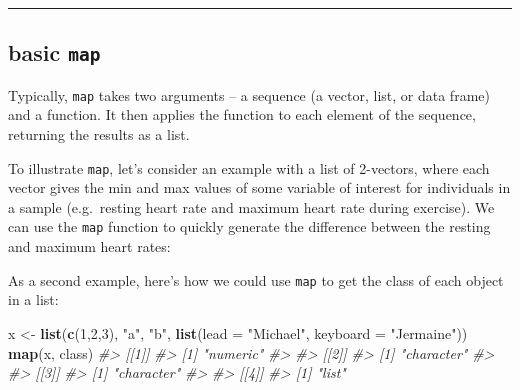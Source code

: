 \documentclass[]{book}
\newenvironment{Shaded}{\begin{snugshade}}{\end{snugshade}}
\newcommand{\CommentTok}[1]{\textcolor[rgb]{0.56,0.35,0.01}{\textit{#1}}}
\newcommand{\ControlFlowTok}[1]{\textcolor[rgb]{0.13,0.29,0.53}{\textbf{#1}}}
\newcommand{\DataTypeTok}[1]{\textcolor[rgb]{0.13,0.29,0.53}{#1}}
\newcommand{\DecValTok}[1]{\textcolor[rgb]{0.00,0.00,0.81}{#1}}
\newcommand{\KeywordTok}[1]{\textcolor[rgb]{0.13,0.29,0.53}{\textbf{#1}}}
\newcommand{\NormalTok}[1]{#1}
\newcommand{\OperatorTok}[1]{\textcolor[rgb]{0.81,0.36,0.00}{\textbf{#1}}}
\newcommand{\StringTok}[1]{\textcolor[rgb]{0.31,0.60,0.02}{#1}}
\theoremstyle{definition}
\theoremstyle{definition}
\theoremstyle{definition}
\theoremstyle{remark}
\begin{document}
\begin{center}\rule{0.5\linewidth}{\linethickness}\end{center}

\hypertarget{basic-map}{%
\subsection{\texorpdfstring{basic
\texttt{map}}{basic map}}\label{basic-map}}

Typically, \texttt{map} takes two arguments -- a sequence (a vector,
list, or data frame) and a function. It then applies the function to
each element of the sequence, returning the results as a list.

To illustrate \texttt{map}, let's consider an example with a list of
2-vectors, where each vector gives the min and max values of some
variable of interest for individuals in a sample (e.g.~resting heart
rate and maximum heart rate during exercise). We can use the
\texttt{map} function to quickly generate the difference between the
resting and maximum heart rates:

\begin{Shaded}
\end{Shaded}

As a second example, here's how we could use \texttt{map} to get the
class of each object in a list:

\begin{Shaded}
\begin{Highlighting}[]
\NormalTok{x <-}\StringTok{ }\KeywordTok{list}\NormalTok{(}\KeywordTok{c}\NormalTok{(}\DecValTok{1}\NormalTok{,}\DecValTok{2}\NormalTok{,}\DecValTok{3}\NormalTok{), }\StringTok{"a"}\NormalTok{, }\StringTok{"b"}\NormalTok{, }\KeywordTok{list}\NormalTok{(}\DataTypeTok{lead =} \StringTok{"Michael"}\NormalTok{, }\DataTypeTok{keyboard =} \StringTok{"Jermaine"}\NormalTok{))}
\KeywordTok{map}\NormalTok{(x, class)}
\CommentTok{#> [[1]]}
\CommentTok{#> [1] "numeric"}
\CommentTok{#> }
\CommentTok{#> [[2]]}
\CommentTok{#> [1] "character"}
\CommentTok{#> }
\CommentTok{#> [[3]]}
\CommentTok{#> [1] "character"}
\CommentTok{#> }
\CommentTok{#> [[4]]}
\CommentTok{#> [1] "list"}
\end{Highlighting}
\end{Shaded}
\end{document}
